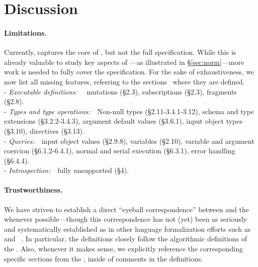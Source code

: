 \section{Discussion}\label{sec:discussion}

\paragraph{Limitations.}

Currently, \gcoql captures the core of \gql, but not the full specification. While this is already valuable to study key aspects of \gql---as illustrated in \S\ref{sec:norm}---more work is needed to fully cover the specification. 
For the sake of exhaustiveness, we now list all missing features, referring to the \spec sections~\cite{gqlspec} where they are defined.\\
- \emph{Executable definitions:}\ \ %
mutations (\S2.3), subscriptions (\S2.3), fragments (\S2.8).\\
- \emph{Types and type operations:}\ \ Non-null types (\S2.11-3.4.1-3.12), schema and type extensions (\S3.2.2-3.4.3), argument default values (\S3.6.1), input object types (\S3.10), directives (\S3.13).\\
- \emph{Queries:}\ \ input object values (\S2.9.8), variables (\S2.10), variable and argument coercion (\S6.1.2-6.4.1), normal and serial execution (\S6.3.1), error handling (\S6.4.4).\\
- \emph{Introspection:}\ \ fully unsupported (\S4). 



\paragraph{Trustworthiness.}

We have striven to establish a direct ``eyeball correspondence'' between \gcoql and the \spec whenever possible---though this correspondence has not (yet) been as seriously and systematically established as in other language formalization efforts such as \jscert~\cite{jscert} and \coqr~\cite{coqr}. 
In particular, the \gcoql definitions closely follow the algorithmic definitions of the \spec. Also, whenever it makes sense, we explicitly reference the corresponding specific sections from the \spec, inside of comments in the \coq definitions.

